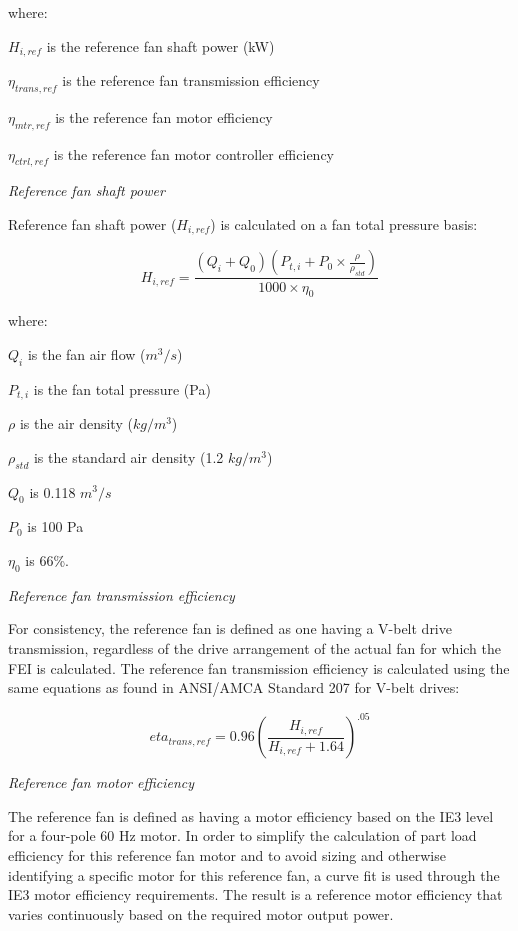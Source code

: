 {{{where:

\(H_{i,ref}\) is the reference fan shaft power (kW)

\(\eta_{trans,ref}\) is the reference fan transmission efficiency

\(\eta_{mtr,ref}\) is the reference fan motor efficiency

\(\eta_{ctrl,ref}\) is the reference fan motor controller efficiency

\emph{Reference fan shaft power}

Reference fan shaft power (\(H_{i,ref}\)) is calculated on a fan total pressure basis:

\begin{equation}
H_{i,ref}=\frac{(Q_i + Q_0)(P_{t,i} + P_0 \times \frac{\rho}{\rho_{std}} )}{1000 \times \eta_0}
\label{eq:Href_calculation}
\end{equation}

where:

\(Q_i\) is the fan air flow (\(m^3/s\))

\(P_{t,i}\) is the fan total pressure (Pa)

\(\rho\) is the air density (\(kg/m^3\))

\(\rho_{std}\) is the standard air density (1.2 \(kg/m^3\))

\(Q_0\) is 0.118 \(m^3/s\)

\(P_0\) is 100 Pa

\(\eta_0\) is 66\%.

\emph{Reference fan transmission efficiency}

For consistency, the reference fan is defined as one having a V-belt drive transmission, regardless of the drive arrangement of the actual fan for which the FEI is calculated. The reference fan transmission efficiency is calculated using the same equations as found in ANSI/AMCA Standard 207 for V-belt drives:

\begin{equation}
eta_{trans,ref}=0.96(\frac{H_{i,ref}}{H_{i,ref}+1.64})^{.05}
\label{eq:eta_trans_calculation}
\end{equation}

\emph{Reference fan motor efficiency}

The reference fan is defined as having a motor efficiency based on the IE3 level for a four-pole 60 Hz motor. In order to simplify the calculation of part load efficiency for this reference fan motor and to avoid sizing and otherwise identifying a specific motor for this reference fan, a curve fit is used through the IE3 motor efficiency requirements. The result is a reference motor efficiency that varies continuously based on the required motor output power.

}}}
